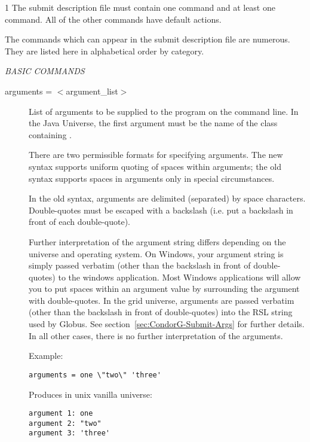 \begin{ManPage}{\label{man-condor-submit}}{1}
The submit description file must contain one  command and at least one
 command.  All of the other commands have default actions.

The commands which can appear in the submit description file are
numerous.  They are listed here in alphabetical order by category.

\emph{BASIC COMMANDS}
\begin{description} 


\item[arguments = $<$argument\_list$>$]
\label{man-condor-submit-arguments}
List of arguments to be supplied
to the program on the command line.   In the Java Universe, the first
argument must be the name of the class containing .

There are two permissible formats for specifying arguments.  The new
syntax supports uniform quoting of spaces within arguments; the old
syntax supports spaces in arguments only in special circumstances.

In the old syntax, arguments are delimited (separated) by space
characters.  Double-quotes must be escaped with a backslash (i.e. put
a backslash in front of each double-quote).

Further interpretation of the argument string differs depending on the
universe and operating system.  On Windows, your argument string is
simply passed verbatim (other than the backslash in front of
double-quotes) to the windows application.  Most Windows applications
will allow you to put spaces within an argument value by surrounding
the argument with double-quotes.  In the grid universe, arguments are
passed verbatim (other than the backslash in front of double-quotes)
into the RSL string used by Globus.  See
section~\ref{sec:CondorG-Submit-Args} for further details.  In all
other cases, there is no further interpretation of the arguments.

Example:

\begin{verbatim}
arguments = one \"two\" 'three'
\end{verbatim}

Produces in unix vanilla universe:

\begin{verbatim}
argument 1: one
argument 2: "two"
argument 3: 'three'
\end{verbatim}


\end{description}
\end{ManPage}
